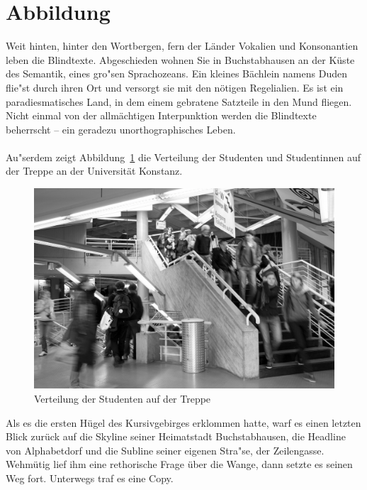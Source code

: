 




\section{Abbildung}

Weit hinten, hinter den Wortbergen, fern der Länder Vokalien und Konsonantien leben die Blindtexte. Abgeschieden wohnen Sie in Buchstabhausen an der Küste des Semantik, eines gro"sen Sprachozeans. Ein kleines Bächlein namens Duden flie"st durch ihren Ort und versorgt sie mit den nötigen Regelialien. Es ist ein paradiesmatisches Land, in dem einem gebratene Satzteile in den Mund fliegen. Nicht einmal von der allmächtigen Interpunktion werden die Blindtexte beherrscht – ein geradezu unorthographisches Leben.\\
\\
Au"serdem zeigt Abbildung~\ref{fig:treppe} die Verteilung der Studenten und Studentinnen auf der Treppe an der Universität Konstanz.
\begin{figure}[H]
\includegraphics[width=\textwidth]{graphics/indoor_sw.png}
\caption{Verteilung der Studenten auf der Treppe}
\label{fig:treppe}
\end{figure}

\noindent Als es die ersten Hügel des Kursivgebirges erklommen hatte, warf es einen letzten Blick zurück auf die Skyline seiner Heimatstadt Buchstabhausen, die Headline von Alphabetdorf und die Subline seiner eigenen Stra"se, der Zeilengasse. Wehmütig lief ihm eine rethorische Frage über die Wange, dann setzte es seinen Weg fort. Unterwegs traf es eine Copy.



